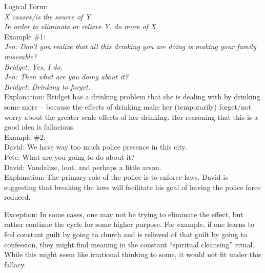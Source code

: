 \documentclass[a4paper,12pt,single,pdftex]{scrbook}
\begin{document}
    
      Logical Form:
    \\

    
      {\em X causes/is the source of Y.}
    \\

    
      {\em In order to eliminate or relieve Y, do more of X.}
    \\

    
      Example \#1:
    \\

    
      {\em Jen: Don’t you realize that all this drinking you are doing is making your family miserable?}
    \\

    
      {\em Bridget: Yes, I do.}
    \\

    
      {\em Jen: Then what are you doing about it?}
    \\

    
      {\em Bridget: Drinking to forget.}
    \\

    
      Explanation: Bridget has a drinking problem that she is dealing with by drinking some more -- because the effects of drinking make her (temporarily) forget/not worry about the greater scale effects of her drinking.  Her reasoning that this is a good idea is fallacious.
    \\

    
      Example \#2:
    \\

    
      David: We have way too much police presence in this city.
    \\

    
      Pete: What are you going to do about it?
    \\

    
      David: Vandalize, loot, and perhaps a little arson.
    \\

    
      Explanation: The primary role of the police is to enforce laws. David is suggesting that breaking the laws will facilitate his goal of having the police force reduced.
    
    
       \newline

      

      
        Exception: In some cases, one may not be trying to eliminate the effect, but rather continue the cycle for some higher purpose. For example, if one learns to feel constant guilt by going to church and is relieved of that guilt by going to confession, they might find meaning in the constant “spiritual cleansing” ritual. While this might seem like irrational thinking to some, it would not fit under this fallacy.
      \\
\end{document}
